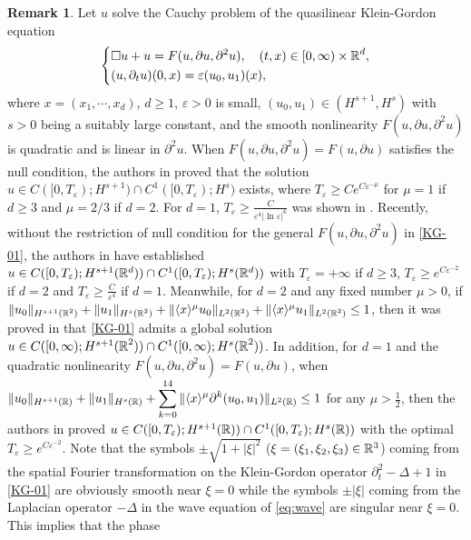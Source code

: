 \documentclass[11pt,twoside]{article}
\def\R{\mathop{\mathbb R\kern 0pt}\nolimits}
\def\ds{\displaystyle}
\def\f{\frac}
\def\p{\partial}
\def\ve{\varepsilon}
\newcommand{\w}[1]{\langle {#1} \rangle}
\theoremstyle{plain}
\theoremstyle{definition}
\newtheorem{remark}{Remark}[section]
\numberwithin{equation}{section}
\begin{document}
\begin{remark}\label{rmk:1.4-1}
Let $u$ solve the Cauchy problem of the quasilinear Klein-Gordon equation
\begin{equation}\label{KG-01}
\left\{
\begin{aligned}
&\Box u+u=F(u,\p u,\p^2u),\quad(t,x)\in[0,\infty)\times\R^d,\\
&(u,\p_tu)(0,x)=\ve(u_0,u_1)(x),
\end{aligned}
\right.
\end{equation}
where $x=(x_1,\cdots,x_d)$, $d\ge1$, $\ve>0$ is small, $(u_0,u_1)\in (H^{s+1}, H^s)$ with $s>0$ being a suitably large constant,
and the smooth nonlinearity $F(u,\p u,\p^2u)$ is quadratic
and is linear in $\p^2u$. When $F(u,\p u,\p^2u)=F(u,\p u)$ satisfies the null condition, the authors in \cite{DelortFang}
proved that the solution $u\in C([0,T_\varepsilon); H^{s+1})\cap  C^1([0,T_\varepsilon); H^{s})$
exists, where $T_\varepsilon\ge Ce^{C\varepsilon^{-\mu}}$ for $\mu=1$ if $d\ge3$ and $\mu=2/3$ if $d=2$.
For $d=1$, $T_{\ve}\ge \frac{C}{\ve^4 |\ln\ve|^6}$ was shown in \cite{Delort97}.
Recently, without the restriction of null condition for the general $F(u,\p u, \p^2 u)$ in \eqref{KG-01}, the authors
in \cite{HouYin2} have established $u\in C([0,T_\varepsilon); H^{s+1}(\Bbb R^d))
\cap  C^1([0,T_\varepsilon); H^{s}(\Bbb R^d))$ with $T_\varepsilon=+\infty$ if $d\ge3$,
$T_\varepsilon\ge e^{C\varepsilon^{-2}}$ if $d=2$ and $T_\varepsilon\ge \frac{C}{\ve^4}$ if $d=1$.
Meanwhile, for $d=2$ and any fixed number $\mu>0$, if
$\|u_0\|_{H^{s+1}(\R^2)}+\|u_1\|_{H^{s}(\R^2)}
+\|\w{x}^\mu u_0\|_{L^2(\R^2)}+\|\w{x}^\mu u_1\|_{L^2(\R^2)}\le 1$,
then it was proved in \cite{HouYin2} that \eqref{KG-01} admits a  global solution
$u\in C([0,\infty);H^{s+1}(\R^2))\cap C^1([0,\infty);H^{s}(\R^2))$.
In addition, for $d=1$ and the quadratic nonlinearity $F(u,\p u,\p^2u)=F(u,\p u)$,
when $\|u_0\|_{H^{s+1}(\R)}+\|u_1\|_{H^s(\R)}
+\ds\sum_{k=0}^{14}\|\w{x}^\mu\p^k(u_0,u_1)\|_{L^2(\R)}\le 1$ for any $\mu>\f12$,
then the authors in \cite{HouTaoYin} proved $u\in C([0,T_\varepsilon); H^{s+1}(\Bbb R))
\cap  C^1([0,T_\varepsilon); H^{s}(\Bbb R))$ with the optimal $T_\varepsilon\ge e^{C\varepsilon^{-2}}$.
Note that the symbols  $\pm\sqrt{1+|\xi|^2}$ ($\xi=(\xi_1,\xi_2,\xi_3)\in\Bbb R^3$) coming from the
spatial Fourier transformation on the Klein-Gordon operator $\p_t^2-\Delta +1$ in \eqref{KG-01} are obviously smooth
near $\xi=0$ while the symbols $\pm|\xi|$ coming from the Laplacian operator $-\Delta$
in the wave equation of \eqref{eq:wave} are singular near $\xi=0$. This implies that the phase

\end{remark}
\end{document}
